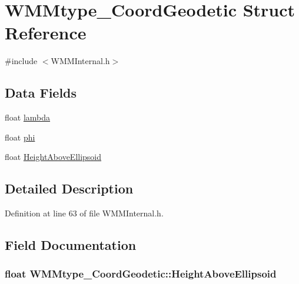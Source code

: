 \hypertarget{struct_w_m_mtype___coord_geodetic}{\section{W\-M\-Mtype\-\_\-\-Coord\-Geodetic Struct Reference}
\label{struct_w_m_mtype___coord_geodetic}
}


{\ttfamily \#include $<$W\-M\-M\-Internal.\-h$>$}

\subsection*{Data Fields}
\begin{DoxyCompactItemize}
\item 
float \hyperlink{struct_w_m_mtype___coord_geodetic_aaf9acfaad6b8964779cbd7f0bfa96170}{lambda}
\item 
float \hyperlink{struct_w_m_mtype___coord_geodetic_a830561cbe026055e7aadb6c004b31f08}{phi}
\item 
float \hyperlink{struct_w_m_mtype___coord_geodetic_ad607d07209c8321f31ff85601254410b}{Height\-Above\-Ellipsoid}
\end{DoxyCompactItemize}


\subsection{Detailed Description}


Definition at line 63 of file W\-M\-M\-Internal.\-h.



\subsection{Field Documentation}
\hypertarget{struct_w_m_mtype___coord_geodetic_ad607d07209c8321f31ff85601254410b}{
\subsubsection[{Height\-Above\-Ellipsoid}]{\setlength{\rightskip}{0pt plus 5cm}float W\-M\-Mtype\-\_\-\-Coord\-Geodetic\-::\-Height\-Above\-Ellipsoid}}\label{struct_w_m_mtype___coord_geodetic_ad607d07209c8321f31ff85601254410b}


